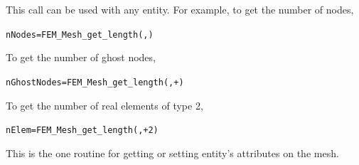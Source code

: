 This call can be used with any entity.
For example, to get the number of nodes,
  \begin{alltt}
      nNodes=FEM\_Mesh\_get\_length(,)
  \end{alltt}
To get the number of ghost nodes, 
  \begin{alltt}
      nGhostNodes=FEM\_Mesh\_get\_length(,+)
  \end{alltt}
To get the number of real elements of type 2,
  \begin{alltt}
  	nElem=FEM\_Mesh\_get\_length(,+2)
  \end{alltt}



This is the one routine for getting or setting entity's attributes 
on the mesh.  

